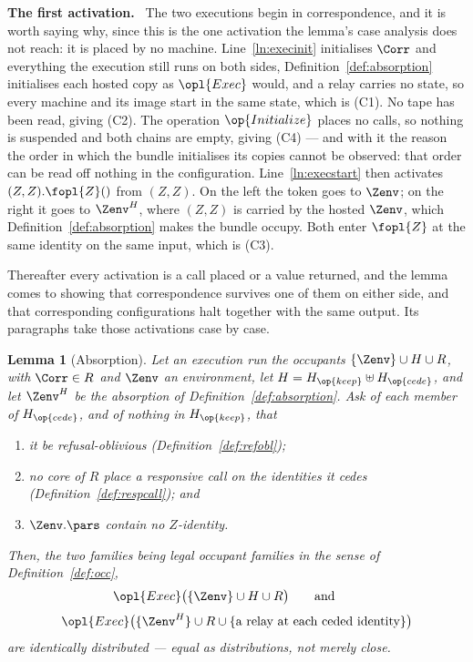 \documentclass[10pt,oneside,openany]{book}
\newcommand{\heading}[1]{\medskip\par\noindent\textcolor{accent}{\textbf{#1.}}\ }
\theoremstyle{accentdef}
\theoremstyle{accentplain}
\newtheorem{lemma}[definition]{Lemma}
\begin{document}
\heading{The first activation} The two executions begin in correspondence, and it is worth saying
why, since this is the one activation the lemma's case analysis does not reach: it is placed by no
machine. Line~\ref{ln:execinit} initialises $\Corr$ and everything the execution still runs on both
sides, Definition~\ref{def:absorption} initialises each hosted copy as $\opl{Exec}$ would, and a
relay carries no state, so every machine and
its image start in the same state, which is (C1). No tape has been read, giving (C2).
The operation $\op{Initialize}$ places no calls, so nothing is suspended and both chains are empty, giving (C4)
--- and with it the reason the order in which the bundle initialises its copies cannot be observed:
that order can be read off nothing in the configuration. Line~\ref{ln:execstart} then activates
$(Z,Z).\fopl{Z}()$ from $(Z,Z)$. On the left the token goes to $\Zenv$; on the right it goes to
$\Zenv^{H}$, where $(Z,Z)$ is carried by the hosted $\Zenv$, which
Definition~\ref{def:absorption} makes the bundle occupy. Both enter $\fopl{Z}$ at the same identity on
the same input, which is (C3).

Thereafter every activation is a call placed or a value returned, and the lemma comes to showing
that correspondence survives one of them on either side, and that corresponding configurations halt
together with the same output. Its paragraphs take those activations case by case.

\begin{lemma}[Absorption]\label{lem:absorb}
Let an execution run the occupants $\{\Zenv\} \cup H \cup R$, with $\Corr \in R$ and $\Zenv$ an
environment, let $H = H_{\op{keep}} \uplus H_{\op{cede}}$, and let $\Zenv^{H}$ be the absorption of
Definition~\ref{def:absorption}. Ask of each member of $H_{\op{cede}}$, and of nothing in
$H_{\op{keep}}$, that
\begin{enumerate}[label=(\alph*),leftmargin=2.2em]
  \item it be refusal-oblivious (Definition~\ref{def:refobl});
  \item no core of $R$ place a responsive call on the identities it cedes
        (Definition~\ref{def:respcall}); and
  \item $\Zenv.\pars$ contain no $Z$-identity.
\end{enumerate}
Then, the two families being legal occupant families in the sense of Definition~\ref{def:occ},
\[
  \begin{gathered}
  \opl{Exec}\bigl(\{\Zenv\} \cup H \cup R\bigr)
  \qquad\text{and}\qquad \\[3pt]
  \opl{Exec}\bigl(\{\Zenv^{H}\} \cup R \cup \{\text{a relay at each ceded identity}\}\bigr)
  \end{gathered}
\]
are identically distributed --- equal as distributions, not merely close.
\end{lemma}
\end{document}
